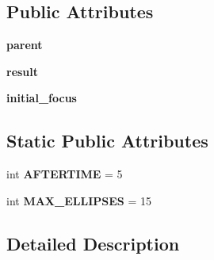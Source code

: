 \subsection*{Public Attributes}
\begin{DoxyCompactItemize}
\item 
{\bfseries parent}\hypertarget{classnegui_1_1pgguiutilities_1_1PGGUIMessageWaitForResultsAndActionOnCancel_a521c6b40ad05354b050710ac78203481}{}\label{classnegui_1_1pgguiutilities_1_1PGGUIMessageWaitForResultsAndActionOnCancel_a521c6b40ad05354b050710ac78203481}

\item 
{\bfseries result}\hypertarget{classnegui_1_1pgguiutilities_1_1PGGUIMessageWaitForResultsAndActionOnCancel_a07eaef8af999f995724c799deb025cd3}{}\label{classnegui_1_1pgguiutilities_1_1PGGUIMessageWaitForResultsAndActionOnCancel_a07eaef8af999f995724c799deb025cd3}

\item 
{\bfseries initial\+\_\+focus}\hypertarget{classnegui_1_1pgguiutilities_1_1PGGUIMessageWaitForResultsAndActionOnCancel_aea57097ae50479d9f40a782f1d63e0b7}{}\label{classnegui_1_1pgguiutilities_1_1PGGUIMessageWaitForResultsAndActionOnCancel_aea57097ae50479d9f40a782f1d63e0b7}

\end{DoxyCompactItemize}
\subsection*{Static Public Attributes}
\begin{DoxyCompactItemize}
\item 
int {\bfseries A\+F\+T\+E\+R\+T\+I\+ME} = 5\hypertarget{classnegui_1_1pgguiutilities_1_1PGGUIMessageWaitForResultsAndActionOnCancel_a642606791127efea885e67926f7d3a0e}{}\label{classnegui_1_1pgguiutilities_1_1PGGUIMessageWaitForResultsAndActionOnCancel_a642606791127efea885e67926f7d3a0e}

\item 
int {\bfseries M\+A\+X\+\_\+\+E\+L\+L\+I\+P\+S\+ES} = 15\hypertarget{classnegui_1_1pgguiutilities_1_1PGGUIMessageWaitForResultsAndActionOnCancel_af6859195069b1d6b05f3d60d72f7f5e2}{}\label{classnegui_1_1pgguiutilities_1_1PGGUIMessageWaitForResultsAndActionOnCancel_af6859195069b1d6b05f3d60d72f7f5e2}

\end{DoxyCompactItemize}


\subsection{Detailed Description}


